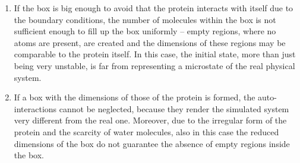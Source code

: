 \begin{enumerate}
\item If the box is big enough to avoid that the protein interacts with itself due to the boundary conditions, the number of molecules within the box is not sufficient enough to fill up the box uniformly – empty regions, where no atoms are present, are created and the dimensions of these regions may be comparable to the protein itself. In this case, the initial state, more than just being very unstable, is far from representing a microstate of the real physical system.
\item If a box with the dimensions of those of the protein is formed, the auto-interactions cannot be neglected, because they render the simulated system very different from the real one. Moreover, due to the irregular form of the protein and the scarcity of water molecules, also in this case the reduced dimensions of the box do not guarantee the absence of empty regions inside the box.
\end{enumerate}

